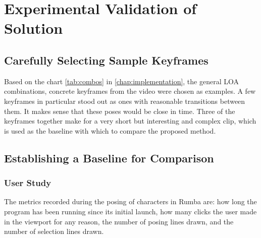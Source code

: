 \chapter{Experimental Validation of Solution}\label{chap:results}
\section{Carefully Selecting Sample Keyframes}
Based on the chart \autoref{tab:combos} in \autoref{chap:implementation}, the general LOA combinations, concrete keyframes from the video were chosen as examples. A few keyframes in particular stood out as ones with reasonable transitions between them. It makes sense that these poses would be close in time. Three of the keyframes together make for a very short but interesting and complex clip, which is used as the baseline with which to compare the proposed method.

\section{Establishing a Baseline for Comparison}
\subsection{User Study}


The metrics recorded during the posing of characters in Rumba are: how long the program has been running since its initial launch, how many clicks the user made in the viewport for any reason, the number of posing lines drawn, and the number of selection lines drawn.


